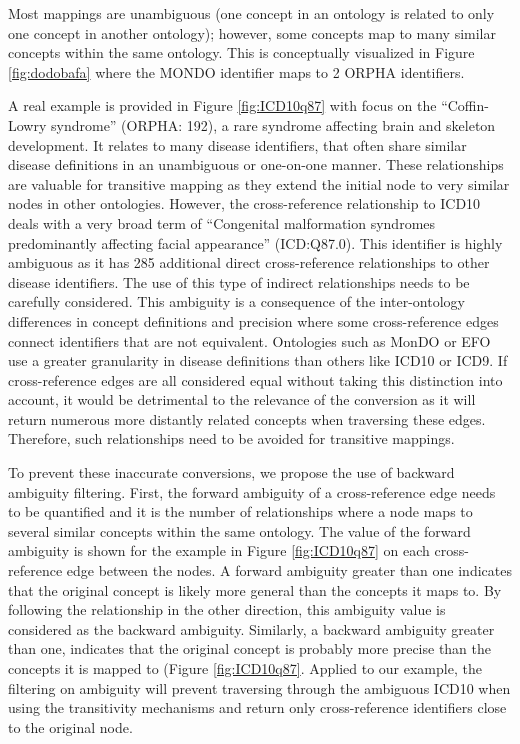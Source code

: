 \documentclass[9pt,a4paper,]{extarticle}
\begin{document}
Most mappings are unambiguous (one concept in an ontology is related to only one concept in another ontology); however, some concepts map to many similar concepts within the same ontology. This is conceptually visualized in Figure \ref{fig:dodobafa} where the MONDO identifier maps to 2 ORPHA identifiers.

A real example is provided in Figure \ref{fig:ICD10q87} with focus on the ``Coffin-Lowry syndrome'' (ORPHA: 192), a rare syndrome affecting brain and skeleton development. It relates to many disease identifiers, that often share similar disease definitions in an unambiguous or one-on-one manner. These relationships are valuable for transitive mapping as they extend the initial node to very similar nodes in other ontologies. However, the cross-reference relationship to ICD10 deals with a very broad term of ``Congenital malformation syndromes predominantly affecting facial appearance'' (ICD:Q87.0). This identifier is highly ambiguous as it has 285 additional direct cross-reference relationships to other disease identifiers. The use of this type of indirect relationships needs to be carefully considered. This ambiguity is a consequence of the inter-ontology differences in concept definitions and precision where some cross-reference edges connect identifiers that are not equivalent. Ontologies such as MonDO or EFO use a greater granularity in disease definitions than others like ICD10 or ICD9. If cross-reference edges are all considered equal without taking this distinction into account, it would be detrimental to the relevance of the conversion as it will return numerous more distantly related concepts when traversing these edges. Therefore, such relationships need to be avoided for transitive mappings.

To prevent these inaccurate conversions, we propose the use of backward ambiguity filtering. First, the forward ambiguity of a cross-reference edge needs to be quantified and it is the number of relationships where a node maps to several similar concepts within the same ontology. The value of the forward ambiguity is shown for the example in Figure \ref{fig:ICD10q87} on each cross-reference edge between the nodes. A forward ambiguity greater than one indicates that the original concept is likely more general than the concepts it maps to. By following the relationship in the other direction, this ambiguity value is considered as the backward ambiguity. Similarly, a backward ambiguity greater than one, indicates that the original concept is probably more precise than the concepts it is mapped to (Figure \ref{fig:ICD10q87}. Applied to our example, the filtering on ambiguity will prevent traversing through the ambiguous ICD10 when using the transitivity mechanisms and return only cross-reference identifiers close to the original node.
\end{document}
